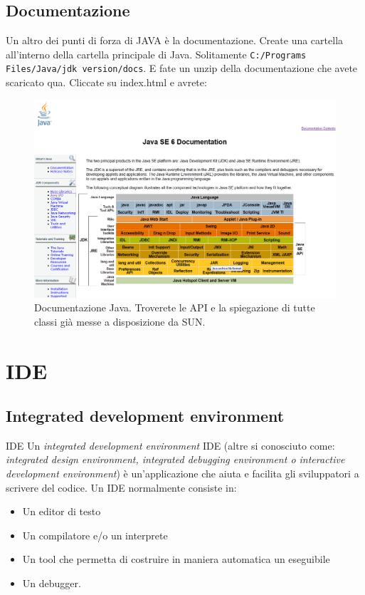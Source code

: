 \subsection*{Documentazione}
\begin{frame}
\begin{block}{}
Un altro dei punti di forza di JAVA è la documentazione. Create una cartella  all'interno della cartella 
principale di Java. Solitamente \texttt{C:/Programs Files/Java/jdk version/docs}. E fate un unzip della documentazione
che avete scaricato qua. Cliccate su index.html e avrete:
\end{block}
\begin{figure}
\begin{center}
\includegraphics[scale=0.2]{images/doc.png}
\caption{\footnotesize{Documentazione Java. Troverete le API e la spiegazione di tutte classi già messe a disposizione da 
SUN.}}
\end{center}
\end{figure}
\end{frame}

\section{IDE}
\subsection*{Integrated development environment}
\begin{frame}
\begin{block}{IDE}
Un \textit{integrated development environment} IDE (altre si conosciuto come: \textit{integrated design environment, integrated 
debugging environment o interactive development environment}) è un'applicazione che aiuta e facilita gli sviluppatori a 
scrivere del codice. Un IDE normalmente consiste in:
\begin{itemize}
\item Un editor di testo
\item Un compilatore e/o un interprete
\item Un tool che permetta di costruire in maniera automatica un eseguibile
\item Un debugger.
\end{itemize}
\end{block}
\end{frame}


